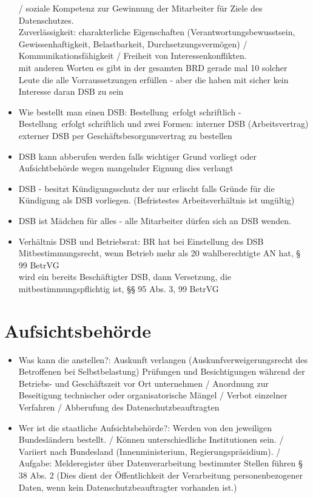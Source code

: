 \documentclass[a4paper,10pt]{scrartcl}
\begin{document}
\begin{itemize}
	/ soziale Kompetenz zur Gewinnung der Mitarbeiter für Ziele des Datenschutzes.\\
	Zuverlässigkeit: charakterliche Eigenschaften (Verantwortungsbewusstsein,          
           Gewissenhaftigkeit, Belastbarkeit,  Durchsetzungsvermögen) / Kommunikationsfähigkeit / Freiheit von Interessenkonflikten.\\
           mit anderen Worten es gibt in der gesamten BRD gerade mal 10 solcher Leute die alle Vorraussetzungen erfüllen - aber die haben mit sicher kein 
           Interesse daran DSB zu sein
           \item Wie bestellt man einen DSB: Bestellung erfolgt schriftlich - Bestellung erfolgt schriftlich und zwei Formen: interner DSB (Arbeitsvertrag) externer DSB
           per Geschäftsbesorgunsvertrag zu bestellen
           \item DSB kann abberufen werden falls wichtiger Grund vorliegt oder Aufsichtbehörde wegen mangelnder Eignung dies verlangt
           \item DSB - besitzt Kündigungsschutz der nur erlischt falls Gründe für die Kündigung als DSB vorliegen. (Befristestes Arbeitsverhältnis ist ungültig)
           \item DSB ist Mädchen für alles - alle Mitarbeiter dürfen sich an DSB wenden.
           \item Verhältnis DSB und Betriebsrat: BR hat bei Einstellung des DSB Mitbestimmungsrecht, wenn Betrieb mehr als 20 wahlberechtigte AN hat, § 99 BetrVG\\
            wird ein bereits Beschäftigter DSB, dann Versetzung, die 
   mitbestimmungspflichtig ist,  §§ 95 Abs. 3, 99 BetrVG
	
\end{itemize}
\section{Aufsichtsbehörde}
\begin{itemize}
 \item Was kann die anstellen?: Auskunft verlangen (Auskunfverweigerungsrecht des Betroffenen bei Selbstbelastung) Prüfungen und Besichtigungen während der Betriebs- und 
    Geschäftszeit vor Ort unternehmen / Anordnung zur Beseitigung technischer oder organisatorische
    Mängel /  Verbot einzelner Verfahren / Abberufung des Datenschutzbeauftragten   
    \item Wer ist die staatliche Aufsichtsbehörde?: Werden von den jeweiligen Bundesländern bestellt. / Können unterschiedliche Institutionen sein. / Variiert  nach Bundesland (Innenministerium, 
   Regierungspräsidium). /  Aufgabe: Melderegister über Datenverarbeitung bestimmter Stellen führen § 38 Abs. 2 (Dies dient der Öffentlichkeit der Verarbeitung personenbezogener Daten, 
wenn kein Datenschutzbeauftragter vorhanden ist.) 
    
 \end{itemize}
 
\end{document}
